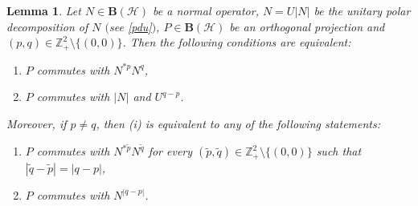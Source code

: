 \documentclass[10pt,a4paper]{amsart}
\newtheorem{lemma}{Lemma}
\newcommand*{\hh}{\mathcal{H}}
\newcommand*{\ogr}{\boldsymbol{B}}
\newcommand*{\zbb}{\mathbb{Z}}
\begin{document}
   \begin{lemma} \label{npq}
Let $N\in \ogr(\hh)$ be a normal operator,
$N=U |N|$ be the unitary polar decomposition
of $N$ $($see \eqref{pdu}$)$, $P \in
\ogr(\hh)$ be an orthogonal projection and
$(p,q)\in \zbb_+^2 \setminus \{(0,0)\}$.
Then the following conditions are
equivalent{\em :}
   \begin{enumerate}
   \item[(i)] $P$ commutes with $N^{*p}N^q$,
   \item[(ii)] $P$ commutes with $|N|$ and
$U^{q-p}$.
   \end{enumerate}
Moreover, if $p\neq q$, then {\em (i)} is
equivalent to any of the following
statements{\em :}
   \begin{enumerate}
   \item[(iii)] $P$ commutes with
$N^{*{\tilde p}}N^{\tilde q}$ for every
$(\tilde p, \tilde q) \in \zbb_+^2 \setminus
\{(0,0)\}$ such that $|\tilde q-\tilde
p|=|q-p|$,
   \item[(iv)] $P$ commutes with $N^{|q-p|}$.
   \end{enumerate}
   \end{lemma}
\end{document}
